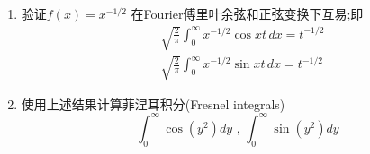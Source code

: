 \documentclass[11pt]{article}
\begin{document}
\vspace{0.5cm}
  
  
\begin{hwproblem}{}
    \begin{enumerate}
        \item 验证$f(x)=x^{-1 / 2}$ 在Fourier傅里叶余弦和正弦变换下互易;即
        $$
        \begin{aligned}
        & \sqrt{\frac{2}{\pi}} \int_0^{\infty} x^{-1 / 2} \cos {x t} \, dx=t^{-1 / 2} \\
        & \sqrt{\frac{2}{\pi}} \int_0^{\infty} x^{-1 / 2} \sin {x t} \, dx=t^{-1 / 2}
        \end{aligned}
        $$
        \item 使用上述结果计算菲涅耳积分(Fresnel integrals)
        $$
        \int_0^{\infty} \cos \left(y^2\right) d y \text { , } \int_0^{\infty} \sin \left(y^2\right) d y
        $$
      \end{enumerate}
\end{hwproblem}

\vspace{0.5cm}

\hwrequirements
\end{document}
